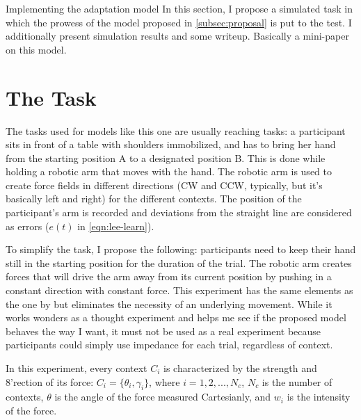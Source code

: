 \documentclass{report}
\begin{document}

\begin{chapter}{Implementing the adaptation model} In this section, I propose a
simulated task in which the prowess of the model proposed in
\ref{subsec:proposal} is put to the test. I additionally present simulation
results and some writeup. Basically a mini-paper on this model.

\section{The Task} The tasks used for models like this one are usually
\citep[e.g.][]{Lee_Dual_2009} reaching tasks: a participant sits in front of a
table with shoulders immobilized, and has to bring her hand from the starting
position A to a designated position B. This is done while holding a robotic arm
that moves with the hand. The robotic arm is used to create force fields in
different directions (CW and CCW, typically, but it's basically left and right)
for the different contexts. The position of the participant's arm is recorded
and deviations from the straight line are considered as errors ($e(t)$ in
\ref{eqn:lee-learn}).

To simplify the task, I propose the following: participants need to keep their
hand still in the starting position for the duration of the trial. The robotic
arm creates forces that will drive the arm away from its current position by
pushing in a constant direction with constant force. This experiment has the
same elements as the one by \cite{Lee_Dual_2009} but eliminates the necessity
of an underlying movement. While it works wonders as a thought experiment and
helps me see if the proposed model behaves the way I want, it must not be used
as a real experiment because participants could simply use impedance for each
trial, regardless of context.

In this experiment, every context $C_i$ is characterized by the strength and
8'rection of its force: $C_i = \{\theta_i, \gamma_i\}$, where $i = 1, 2, ...,
N_c$, $N_c$ is the number of contexts, $\theta$ is the angle of the force
measured Cartesianly, and $w_i$ is the intensity of the force.


\end{chapter}
\end{document}
